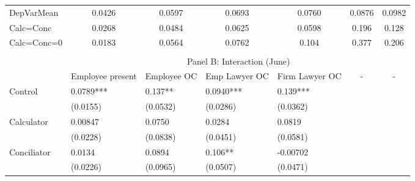 \begin{tabular}{rrrrrrr}
\multicolumn{1}{l}{DepVarMean} & \multicolumn{1}{c}{0.0426} & \multicolumn{1}{c}{0.0597} & \multicolumn{1}{c}{0.0693} & \multicolumn{1}{c}{0.0760} & \multicolumn{1}{c}{0.0876} & \multicolumn{1}{c}{0.0982} \\
\multicolumn{1}{l}{Calc=Conc} & \multicolumn{1}{c}{0.0268} & \multicolumn{1}{c}{0.0484} & \multicolumn{1}{c}{0.0625} & \multicolumn{1}{c}{0.0598} & \multicolumn{1}{c}{0.196} & \multicolumn{1}{c}{0.128} \\
\multicolumn{1}{l}{Calc=Conc=0} & \multicolumn{1}{c}{0.0183} & \multicolumn{1}{c}{0.0564} & \multicolumn{1}{c}{0.0762} & \multicolumn{1}{c}{0.104} & \multicolumn{1}{c}{0.377} & \multicolumn{1}{c}{0.206} \\
\bottomrule
\multicolumn{1}{l}{} &       &       &       &       &       &  \\
\toprule
\multicolumn{1}{l}{} & \multicolumn{6}{c}{Panel B: Interaction (June)} \\
\midrule
\multicolumn{1}{l}{} & \multicolumn{1}{c}{Employee present} & \multicolumn{1}{c}{Employee OC} & \multicolumn{1}{c}{Emp Lawyer OC} & \multicolumn{1}{c}{Firm Lawyer OC} & \multicolumn{1}{c}{-} & \multicolumn{1}{c}{-} \\
\midrule
\midrule
\multicolumn{1}{l}{Control} & \multicolumn{1}{l}{0.0789***} & \multicolumn{1}{l}{0.137**} & \multicolumn{1}{l}{0.0940***} & \multicolumn{1}{l}{0.139***} & \multicolumn{1}{l}{} & \multicolumn{1}{l}{} \\
\multicolumn{1}{l}{} & \multicolumn{1}{l}{(0.0155)} & \multicolumn{1}{l}{(0.0532)} & \multicolumn{1}{l}{(0.0286)} & \multicolumn{1}{l}{(0.0362)} & \multicolumn{1}{l}{} & \multicolumn{1}{l}{} \\
\multicolumn{1}{l}{Calculator} & \multicolumn{1}{l}{0.00847} & \multicolumn{1}{l}{0.0750} & \multicolumn{1}{l}{0.0284} & \multicolumn{1}{l}{0.0819} & \multicolumn{1}{l}{} & \multicolumn{1}{l}{} \\
\multicolumn{1}{l}{} & \multicolumn{1}{l}{(0.0228)} & \multicolumn{1}{l}{(0.0838)} & \multicolumn{1}{l}{(0.0451)} & \multicolumn{1}{l}{(0.0581)} & \multicolumn{1}{l}{} & \multicolumn{1}{l}{} \\
\multicolumn{1}{l}{Conciliator} & \multicolumn{1}{l}{0.0134} & \multicolumn{1}{l}{0.0894} & \multicolumn{1}{l}{0.106**} & \multicolumn{1}{l}{-0.00702} & \multicolumn{1}{l}{} & \multicolumn{1}{l}{} \\
\multicolumn{1}{l}{} & \multicolumn{1}{l}{(0.0226)} & \multicolumn{1}{l}{(0.0965)} & \multicolumn{1}{l}{(0.0507)} & \multicolumn{1}{l}{(0.0471)} & \multicolumn{1}{l}{} & \multicolumn{1}{l}{} \\

\end{tabular}
